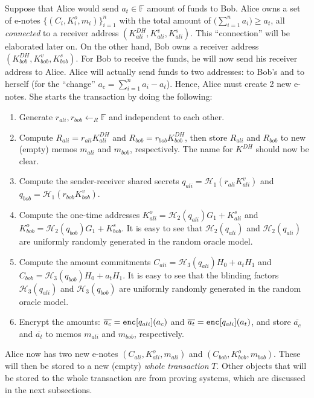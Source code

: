 \documentclass{article}
\begin{document}
Suppose that Alice would send $a_t\in\mathbb{F}$ amount of funds to Bob. Alice owns a set of e-notes $\{(C_i,K_i^o,m_i)\}_{i=1}^n$ with the total amount of $\big(\sum_{i=1}^{n}{a_i}\big)\ge a_t$, all \textit{connected} to a receiver address $(K_{ali}^{DH}, K_{ali}^v, K_{ali}^s)$. This ``connection'' will be elaborated later on. On the other hand, Bob owns a receiver address $(K_{bob}^{DH}, K_{bob}^v, K_{bob}^s)$. For Bob to receive the funds, he will now send his receiver address to Alice. Alice will actually send funds to two addresses: to Bob's and to herself (for the ``change'' $a_c = \sum_{i=1}^{n}{a_i} - a_t$). Hence, Alice must create 2 new e-notes. She starts the transaction by doing the following:
\begin{enumerate}
    \item Generate $r_{ali}, r_{bob}\leftarrow_R\mathbb{F}$ and independent to each other.
    \item Compute $R_{ali} = r_{ali}K_{ali}^{DH}$ and $R_{bob} = r_{bob}K_{bob}^{DH}$, then store $R_{ali}$ and $R_{bob}$ to new (empty) memos $m_{ali}$ and $m_{bob}$, respectively. The name for $K^{DH}$ should now be clear.
    \item Compute the sender-receiver shared secrets $q_{ali} = \mathcal{H}_1(r_{ali}K_{ali}^{v})$ and $q_{bob} = \mathcal{H}_1(r_{bob}K_{bob}^{v})$.
    \item Compute the one-time addresses $K_{ali}^{o} = \mathcal{H}_2(q_{ali})G_1 + K_{ali}^s$ and $K_{bob}^{o} = \mathcal{H}_2(q_{bob})G_1 + K_{bob}^s$. It is easy to see that $\mathcal{H}_2(q_{ali})$ and $\mathcal{H}_2(q_{ali})$ are uniformly randomly generated in the random oracle model.
    \item Compute the amount commitments $C_{ali} = \mathcal{H}_3(q_{ali})H_0 + a_t H_1$ and $C_{bob} = \mathcal{H}_3(q_{bob})H_0 + a_t H_1$. It is easy to see that the blinding factors $\mathcal{H}_3(q_{ali})$ and $\mathcal{H}_3(q_{bob})$ are uniformly randomly generated in the random oracle model.
    \item Encrypt the amounts: $\overline{a_c} = {\tt enc}[q_{ali}](a_c)$ and $\overline{a_t} = {\tt enc}[q_{ali}](a_t)$, and store $\overline{a_c}$ and $\overline{a_t}$ to memos $m_{ali}$ and $m_{bob}$, respectively.
\end{enumerate}
Alice now has two new e-notes $(C_{ali}, K_{ali}^o, m_{ali})$ and $(C_{bob}, K_{bob}^o, m_{bob})$. These will then be stored to a new (empty) \textit{whole transaction} $T$. Other objects that will be stored to the whole transaction are from proving systems, which are discussed in the next subsections.
\end{document}
